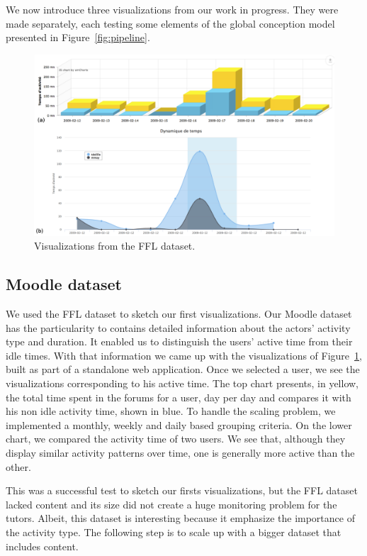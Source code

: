 \documentclass[a4paper,twoside]{article}
\begin{document}
We now introduce three visualizations from our work in progress.  They were made separately, each testing some elements of the global conception model presented in Figure~\ref{fig:pipeline}.


\begin{figure}[t]
  \includegraphics[width=.5\textwidth]{images/dynco_portrait.png}
  \small{
    \caption{\label{fig:dynco}
      Visualizations from the FFL dataset.
    }}
\end{figure}

\subsection{Moodle dataset}
We used the FFL dataset to sketch our first visualizations.  Our Moodle dataset has the particularity to contains detailed information about the actors' activity type and duration.  It enabled us to distinguish the users' active time from their idle times.  With that information we came up with the visualizations of Figure~\ref{fig:dynco}, built as part of a standalone web application.  Once we selected a user, we see the visualizations corresponding to his active time.   The top chart presents, in yellow, the total time spent in the forums for a user, day per day and compares it with his non idle activity time, shown in blue.  To handle the scaling problem, we implemented a monthly, weekly and daily based grouping criteria.  On the lower chart, we compared the activity time of two users.  We see that, although they display similar activity patterns over time, one is generally more active than the other.

This was a successful test to sketch our firsts visualizations, but the FFL dataset lacked content and its size did not create a huge monitoring problem for the tutors.  Albeit, this dataset is interesting because it emphasize the importance of the activity type.  The following step is to scale up with a bigger dataset that includes content.
\end{document}
